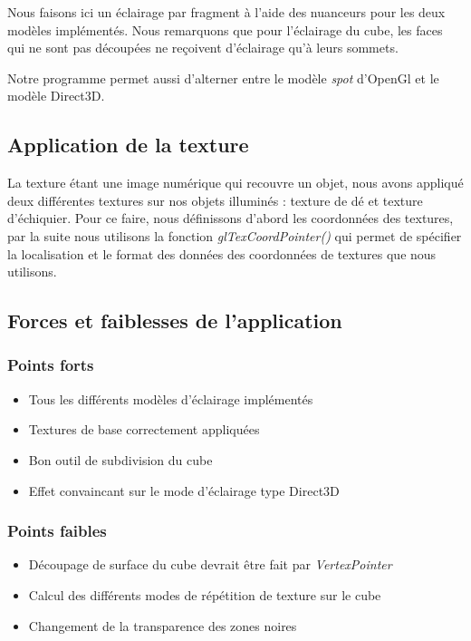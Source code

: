 \documentclass[10pt,a4paper]{article}
\begin{document}
Nous faisons ici un éclairage par fragment à l'aide des nuanceurs pour les deux modèles implémentés. Nous remarquons que pour l'éclairage du cube, les faces qui ne sont pas découpées ne reçoivent d'éclairage qu'à leurs sommets.

Notre programme permet aussi d'alterner entre le modèle \textit{spot} d'OpenGl et le modèle Direct3D.

\subsection{Application de la texture}

La texture étant une image numérique qui recouvre un objet, nous avons appliqué deux différentes textures sur nos objets illuminés : texture de dé et texture d'échiquier. Pour ce faire, nous définissons d'abord les coordonnées des textures, par la suite nous utilisons la fonction \textit{glTexCoordPointer()} qui permet de spécifier la localisation et le format des données des coordonnées de textures que nous utilisons.

\subsection{Forces et faiblesses de l'application}

\subsubsection{Points forts}

\begin{itemize}
	\item Tous les différents modèles d'éclairage implémentés
	\item Textures de base correctement appliquées
	\item Bon outil de subdivision du cube
	\item Effet convaincant sur le mode d'éclairage type Direct3D
\end{itemize}

\subsubsection{Points faibles}

\begin{itemize}
	\item Découpage de surface du cube devrait être fait par \textit{VertexPointer}
	\item Calcul des différents modes de répétition de texture sur le cube
	\item Changement de la transparence des zones noires
\end{itemize}
\end{document}
